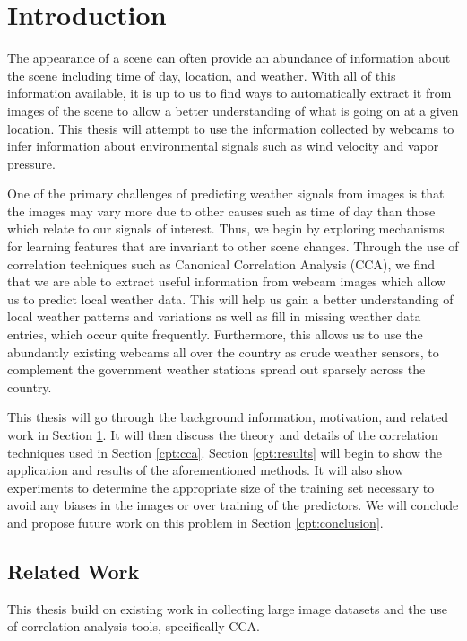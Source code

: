 \chapter{Introduction}
\label{cpt:intro}
The appearance of a scene can often provide an abundance of information about the scene including time of day, location, and weather. With all of this information available, it is up to us to find ways to automatically extract it from images of the scene to allow a better understanding of what is going on at a given location. This thesis will attempt to use the information collected by webcams to infer information about environmental signals such as wind velocity and vapor pressure. 

One of the primary challenges of predicting weather signals from images is that the images may vary more due to other causes such as time of day than those which relate to our signals of interest. Thus, we begin by exploring mechanisms for learning features that are invariant to other scene changes. Through the use of correlation techniques such as Canonical Correlation Analysis (CCA), we find that we are able to extract useful information from webcam images which allow us to predict local weather data. This will help us gain a better understanding of local weather patterns and variations as well as fill in missing weather data entries, which occur quite frequently. Furthermore, this allows us to use the abundantly existing webcams all over the country as crude weather sensors, to complement the government weather stations spread out sparsely across the country. 

This thesis will go through the background information, motivation, and related work in Section \ref{cpt:intro}. It will then discuss the theory and details of the correlation techniques used in Section \ref{cpt:cca}. Section \ref{cpt:results} will begin to show the application and results of the aforementioned methods. It will also show experiments to determine the appropriate size of the training set necessary to avoid any biases in the images or over training of the predictors. We will conclude  and propose future work on this problem in Section \ref{cpt:conclusion}.

\section{Related Work}
This thesis build on existing work in collecting large image datasets and the use of correlation analysis tools, specifically CCA.

